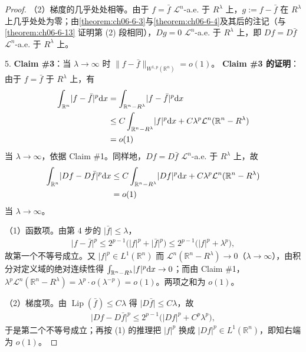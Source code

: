 \documentclass[../../main.tex]{subfiles}%
\begin{document}
\begin{proof}
（2）梯度的几乎处处相等。由于 $f=\bar f$ $\mathcal{L}^n$-a.e. 于 $R^\lambda$ 上，$g:=f-\bar f$ 在 $R^\lambda$ 上几乎处处为零；由\cref{theorem:ch06-6-3}与\cref{theorem:ch06-6-4}及其后的注记（与\cref{theorem:ch06-6-13} 证明第 (2) 段相同），$Dg=0$ $\mathcal{L}^n$-a.e. 于 $R^\lambda$ 上，即 $Df=D\bar f$ $\mathcal{L}^n$-a.e. 于 $R^\lambda$ 上。%

5. \textbf{Claim \#3}：当 $\lambda\to\infty$ 时 $\lVert f-\bar f\rVert_{W^{1,p}(\mathbb{R}^n)}=o(1)$。
\textbf{Claim \#3 的证明}：由于 $f=\bar f$ 于 $R^\lambda$ 上，有
\begin{align*}
\int_{\mathbb{R}^n}\lvert f-\bar f\rvert^p\mathrm{d} x&=\int_{\mathbb{R}^n-R^\lambda}\lvert f-\bar f\rvert^p\mathrm{d} x\\
&\le C\int_{\mathbb{R}^n-R^\lambda}\lvert f\rvert^p\mathrm{d} x+C\lambda^p\mathcal{L}^n(\mathbb{R}^n-R^\lambda)\\
&=o(1)
\end{align*}
当 $\lambda\to\infty$，依据 Claim \#1。同样地，$Df=D\bar f$ $\mathcal{L}^n$-a.e. 于 $R^\lambda$ 上，故
\begin{align*}
\int_{\mathbb{R}^n}\lvert Df-D\bar f\rvert^p\mathrm{d} x&\le C\int_{\mathbb{R}^n-R^\lambda}\lvert Df\rvert^p\mathrm{d} x+C\lambda^p\mathcal{L}^n(\mathbb{R}^n-R^\lambda)\\
&=o(1)
\end{align*}
当 $\lambda\to\infty$。

（1）函数项。由第 4 步的 $\lvert\bar f\rvert\le\lambda$，
\begin{align*}
\lvert f-\bar f\rvert^p\le2^{p-1}\bigl(\lvert f\rvert^p+\lvert\bar f\rvert^p\bigr)\le2^{p-1}\bigl(\lvert f\rvert^p+\lambda^p\bigr),
\end{align*}
故第一个不等号成立。又 $\lvert f\rvert^p\in L^1(\mathbb{R}^n)$ 而 $\mathcal{L}^n(\mathbb{R}^n-R^\lambda)\to0$（$\lambda\to\infty$），由积分对定义域的绝对连续性得 $\int_{\mathbb{R}^n-R^\lambda}\lvert f\rvert^p\mathrm{d} x\to0$；而由 Claim \#1，$\lambda^p\mathcal{L}^n(\mathbb{R}^n-R^\lambda)=\lambda^p\cdot o(\lambda^{-p})=o(1)$。两项之和为 $o(1)$。

（2）梯度项。由 $\operatorname{Lip}(\bar f)\le C\lambda$ 得 $\lvert D\bar f\rvert\le C\lambda$，故
\begin{align*}
\lvert Df-D\bar f\rvert^p\le2^{p-1}\bigl(\lvert Df\rvert^p+C^p\lambda^p\bigr),
\end{align*}
于是第二个不等号成立；再按 (1) 的推理把 $\lvert f\rvert^p$ 换成 $\lvert Df\rvert^p\in L^1(\mathbb{R}^n)$，即知右端为 $o(1)$。


\end{proof}
\end{document}
